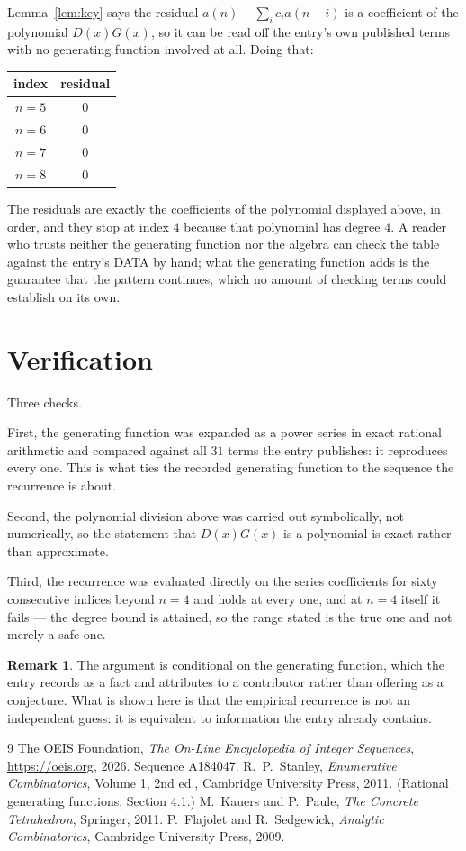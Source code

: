 \documentclass[11pt,a4paper]{article}
\theoremstyle{plain}
\theoremstyle{definition}
\newtheorem{remark}[theorem]{Remark}
\begin{document}
Lemma~\ref{lem:key} says the residual $a(n)-\sum_ic_ia(n-i)$ is a coefficient of the
polynomial $D(x)G(x)$, so it can be read off the entry's own published terms with no
generating function involved at all. Doing that:
\begin{center}
\begin{tabular}{cc}
index & residual \\ \hline
$n=5$ & $0$ \\
$n=6$ & $0$ \\
$n=7$ & $0$ \\
$n=8$ & $0$
\end{tabular}
\end{center}
The residuals are exactly the coefficients of the polynomial displayed above, in order, and
they stop at index $4$ because that polynomial has degree $4$. A reader who trusts
neither the generating function nor the algebra can check the table against the entry's DATA
by hand; what the generating function adds is the guarantee that the pattern continues, which
no amount of checking terms could establish on its own.

\section{Verification}

Three checks.

First, the generating function was expanded as a power series in exact rational arithmetic and
compared against all $31$ terms the entry publishes: it reproduces every one. This is
what ties the recorded generating function to the sequence the recurrence is about.

Second, the polynomial division above was carried out symbolically, not numerically, so the
statement that $D(x)G(x)$ is a polynomial is exact rather than approximate.

Third, the recurrence was evaluated directly on the series coefficients for sixty consecutive
indices beyond $n=4$ and holds at every one, and at $n=4$ itself it fails --- the
degree bound is attained, so the range stated is the true one and not merely a safe one.

\begin{remark}
The argument is conditional on the generating function, which the entry records as a fact and
attributes to a contributor rather than offering as a conjecture. What is shown here is that
the empirical recurrence is not an independent guess: it is equivalent to information the
entry already contains.
\end{remark}

\begin{thebibliography}{9}
 The OEIS Foundation, \emph{The On-Line Encyclopedia of Integer
Sequences}, \url{https://oeis.org}, 2026. Sequence A184047.
 R.~P.~Stanley, \emph{Enumerative Combinatorics}, Volume 1, 2nd ed.,
Cambridge University Press, 2011. (Rational generating functions, Section 4.1.)
 M.~Kauers and P.~Paule, \emph{The Concrete Tetrahedron}, Springer, 2011.
 P.~Flajolet and R.~Sedgewick, \emph{Analytic Combinatorics}, Cambridge
University Press, 2009.
\end{thebibliography}
\end{document}
